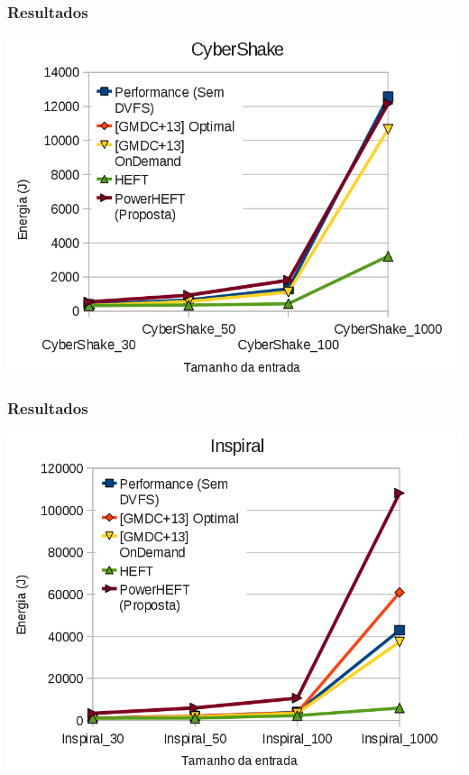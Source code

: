 \documentclass{beamer}
\begin{document}
\begin{frame}
\frametitle{Resultados}
	\begin{center}
		\includegraphics[width=0.9\columnwidth]{CyberShake.png}
	\end{center}
\end{frame}


\begin{frame}
\frametitle{Resultados}
	\begin{center}
		\includegraphics[width=0.9\columnwidth]{Inspiral.png}
	\end{center}
\end{frame}


\end{document}
